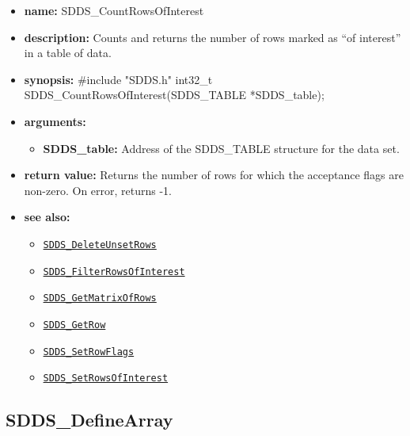 \documentclass[11pt]{article}
\newcommand{\progref}[1]{\hyperref[SDDS_#1]{\tt SDDS\_#1}}
\begin{document}
\begin{itemize}
\item {\bf name:}\newline
SDDS\_CountRowsOfInterest
\item {\bf description:}\newline
Counts and returns the number of rows marked as ``of interest'' in a table of data.
\item {\bf synopsis:} \#include "SDDS.h"\newline
int32\_t SDDS\_CountRowsOfInterest(SDDS\_TABLE *SDDS\_table);
\item {\bf arguments:}
\begin{itemize}
\item {\bf SDDS\_table:} Address of the SDDS\_TABLE structure for the data set.
\end{itemize}
\item {\bf return value:}\newline
Returns the number of rows for which the acceptance flags are non-zero. On error, returns -1.
\item {\bf see also:}
\begin{itemize}
\item \progref{DeleteUnsetRows}
\item \progref{FilterRowsOfInterest}
\item \progref{GetMatrixOfRows}
\item \progref{GetRow}
\item \progref{SetRowFlags}
\item \progref{SetRowsOfInterest}
\end{itemize}
\end{itemize}

\subsection{SDDS\_DefineArray}
\label{SDDS_DefineArray}
\end{document}
